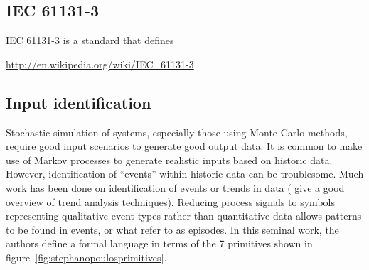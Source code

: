 \subsection{IEC 61131-3}
IEC 61131-3 is a standard that defines

\url{http://en.wikipedia.org/wiki/IEC_61131-3}

\subsection{Input identification}
Stochastic simulation of systems, especially those using Monte Carlo methods, require good input scenarios to generate good output data.
It is common to make use of Markov processes to generate realistic inputs based on historic data.
However, identification of ``events'' within historic data can be troublesome.  
Much work has been done on identification of events or trends in data (\citet{maurya.rengaswamy.ea2007fault} give a good overview of trend analysis techniques).  
Reducing process signals to symbols representing qualitative event types rather than quantitative data allows patterns to be found in events, or what \citet{cheung.stephanopoulos1990representation} refer to as episodes.  
In this seminal work, the authors define a formal language in terms of the 7 primitives shown in figure~\ref{fig:stephanopoulosprimitives}.

